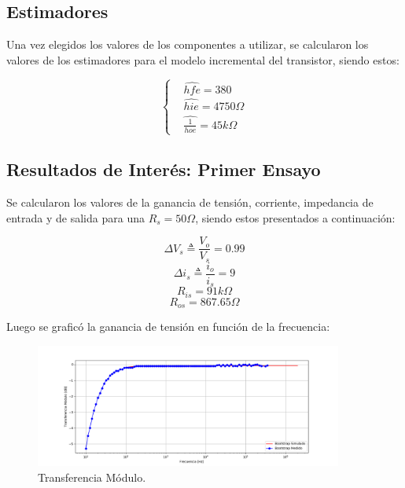 \subsection{Estimadores}

Una vez elegidos los valores de los componentes a utilizar, se calcularon los valores de los estimadores para el modelo incremental del transistor, siendo estos:

\begin{equation*}
\left\{
\begin{aligned}
	& \hat{hfe}=380 \\
	& \hat{hie}=4750\Omega \\
	& \hat{\frac{1}{hoe}} = 45k\Omega
\end{aligned}
\right.
\end{equation*}

\subsection{Resultados de Interés: Primer Ensayo}
Se calcularon los valores de la ganancia de tensión, corriente, impedancia de entrada y de salida para una $R_s=50\Omega$, siendo estos presentados a continuación:

\begin{equation}
	\Delta V_s \triangleq \frac{V_o}{V_s} = 0.99
\end{equation}
\begin{equation}
	\Delta i_s \triangleq \frac{i_o}{i_s} = 9
\end{equation}
\begin{equation}
	R_{is} = 91k\Omega
\end{equation}
\begin{equation}
	R_{os} = 867.65\Omega
\end{equation}

Luego se graficó la ganancia de tensión en función de la frecuencia:
\begin{figure} [H]
	\centering
	\includegraphics[width=0.9\textwidth]{imagenes/avs.png}
	\caption{Transferencia Módulo.}
	\label{fig:transmod}
\end{figure}

